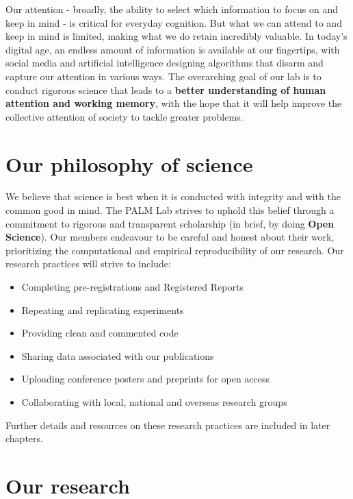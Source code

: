 \documentclass[
]{book}
\providecommand{\tightlist}{%
  \setlength{\itemsep}{0pt}\setlength{\parskip}{0pt}}
\theoremstyle{definition}
\theoremstyle{definition}
\theoremstyle{definition}
\theoremstyle{definition}
\theoremstyle{remark}
\begin{document}
Our attention - broadly, the ability to select which information to focus on and keep in mind - is critical for everyday cognition. But what we can attend to and keep in mind is limited, making what we do retain incredibly valuable. In today's digital age, an endless amount of information is available at our fingertips, with social media and artificial intelligence designing algorithms that disarm and capture our attention in various ways. The overarching goal of our lab is to conduct rigorous science that leads to a \textbf{better understanding of human attention and working memory}, with the hope that it will help improve the collective attention of society to tackle greater problems.

\hypertarget{lab-philosophy}{%
\section{Our philosophy of science}\label{lab-philosophy}}

We believe that science is best when it is conducted with integrity and with the common good in mind. The PALM Lab strives to uphold this belief through a commitment to rigorous and transparent scholarship (in brief, by doing \textbf{Open Science}). Our members endeavour to be careful and honest about their work, prioritizing the computational and empirical reproducibility of our research. Our research practices will strive to include:

\begin{itemize}
\tightlist
\item
  Completing pre-registrations and Registered Reports
\item
  Repeating and replicating experiments
\item
  Providing clean and commented code
\item
  Sharing data associated with our publications
\item
  Uploading conference posters and preprints for open access
\item
  Collaborating with local, national and overseas research groups
\end{itemize}

Further details and resources on these research practices are included in later chapters.

\hypertarget{our-research}{%
\section{Our research}\label{our-research}}
\end{document}
